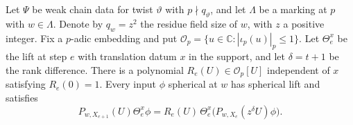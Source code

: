 \begin{lemma}
\label{lem:a-marked-hecke-polynomial}
\emitthmsource
Let $\Psi$ be weak chain data for twist $\vartheta$ with $p\nmid q_\vartheta$, and let $\Lambda$ be a marking at $p$ with $w\in\Lambda$. Denote by $q_w=z^2$ the residue field size of $w$, with $z$ a positive integer. Fix a $p$-adic embedding and put $\mathcal O_p=\{u\in\mathbb C:|\iota_p(u)|_p\le1\}$. Let $\Theta_e^x$ be the lift at step $e$ with translation datum $x$ in the support, and let $\delta=t+1$ be the rank difference. There is a polynomial $R_e(U)\in\mathcal O_p[U]$ independent of $x$ satisfying $R_e(0)=1$. Every input $\phi$ spherical at $w$ has spherical lift and satisfies
\[
 P_{w,X_{e+1}}(U)\Theta_e^x\phi
   =R_e(U)\,\Theta_e^x\bigl(P_{w,X_e}(z^\delta U)\phi\bigr).
\]
\end{lemma}
